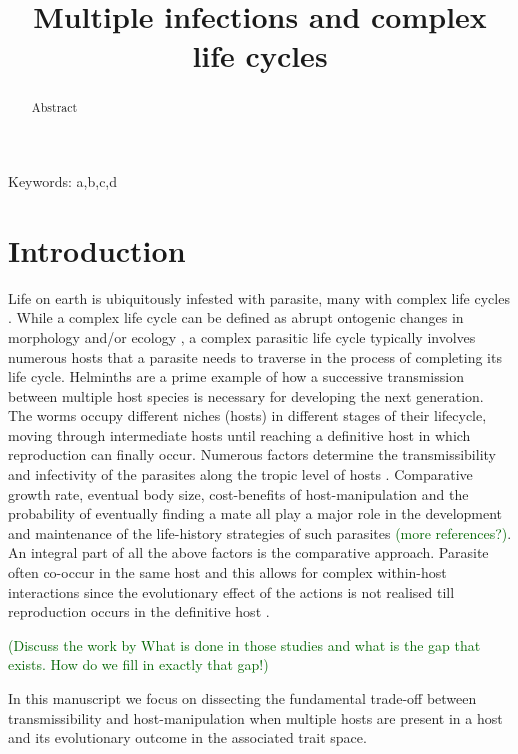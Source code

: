 \documentclass{article}
\title{\vspace*{-22mm}\bf Multiple infections and complex life cycles}
\date{}
\newcommand{\cha}[1]{\textcolor{darkgreen}{(#1)}}
\begin{document}
\linenumbers
\maketitle


\begin{abstract}
Abstract
\end{abstract}


\noindent
Keywords: a,b,c,d


\tableofcontents

\section{Introduction}

Life on earth is ubiquitously infested with parasite, many with complex life cycles \citep{zimmer:book:2001}.
While a complex life cycle can be defined as abrupt ontogenic changes in morphology and/or ecology \citep{Benesh:2016dj}, a complex parasitic life cycle typically involves numerous hosts that a parasite needs to traverse in the process of completing its life cycle.
Helminths are a prime example of how a successive transmission between multiple host species is necessary for developing the next generation.
The worms occupy different niches (hosts) in different stages of their lifecycle, moving through intermediate hosts until reaching a definitive host in which reproduction can finally occur.
Numerous factors determine the transmissibility and infectivity of the parasites along the tropic level of hosts \citep{froelick:PRSB:2021}.
Comparative growth rate, eventual body size, cost-benefits of host-manipulation and the probability of eventually finding a mate all play a major role in the development and maintenance of the life-history strategies of such parasites \citep{parker:Nature:2003,hammerschmidt:Evolution:2009} \cha{more references?}.
An integral part of all the above factors is the comparative approach.
Parasite often co-occur in the same host and this allows for complex within-host interactions since the evolutionary effect of the actions is not realised till reproduction occurs in the definitive host \citep{Hafer:2015gl}.

\cha{Discuss the work by \citep{alizon:AmNat:2008,gandon:Evolution:2009} What is done in those studies and what is the gap that exists. How do we fill in exactly that gap!}

In this manuscript we focus on dissecting the fundamental trade-off between transmissibility and host-manipulation when multiple hosts are present in a host and its evolutionary outcome in the associated trait space.
\end{document}

